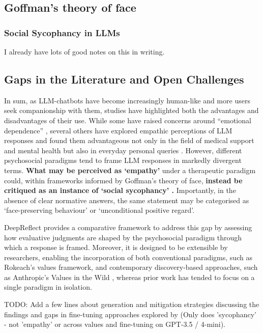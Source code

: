 
\subsection{Goffman's theory of face}
\textcolor{black!30}{\lipsum[9-10]}
\subsubsection{Social Sycophancy in LLMs}

\textcolor{black!30}{\lipsum[12-14]}
\textcolor{black!30}{I already have lots of good notes on this in writing.}


\subsection{Gaps in the Literature and Open Challenges}
In sum, as LLM-chatbots have become increasingly human-like and more users seek companionship with them, studies have highlighted both the advantages and disadvantages of their use. While some have raised concerns around “emotional dependence” \cite{fang-etal-psychoeffects}, several others have explored empathic perceptions of LLM responses and found them advantageous not only in the field of medical support and mental health but also in everyday personal queries \cite{Lee-etal-Empathic}.
However, different psychosocial paradigms tend to frame LLM responses in markedly divergent terms. \textbf{What may be perceived as ‘empathy’} under a therapeutic paradigm could, within frameworks informed by Goffman’s theory of face, \textbf{instead be critiqued as an instance of ‘social sycophancy’ \cite{cheng-etal-sycophancy}.} 
Importantly, in the absence of clear normative answers, the same statement may be categorised as ‘face-preserving behaviour’ or ‘unconditional positive regard’. 

\medskip DeepReflect provides a comparative framework to address this gap by assessing how evaluative judgments are shaped by the psychosocial paradigm through which a response is framed. 
Moreover, it is designed to be extensible by researchers, enabling the incorporation of both conventional paradigms, such as Rokeach’s values framework, and contemporary discovery-based approaches, such as Anthropic’s Values in the Wild \cite{values-in-wild}, whereas prior work has tended to focus on a single paradigm in isolation.

\textcolor{black!30}{TODO: Add a few lines about generation and mitigation strategies discussing the findings and gaps in fine-tuning approaches explored by \cite{cheng-etal-sycophancy} (Only does 'sycophancy' - not 'empathy' or across values and fine-tuning on GPT-3.5 / 4-mini).} 

